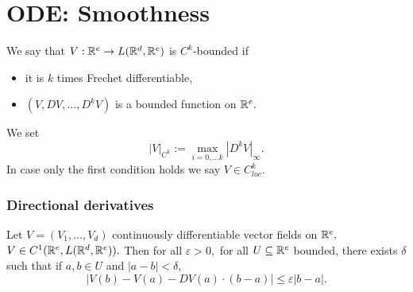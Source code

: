 \section{ODE: Smoothness}

\begin{definition}
    We say that $V: \mathbb{R}^e \rightarrow L(\mathbb{R}^d, \mathbb{R}^e)$ is $C^k$-bounded if
    \begin{itemize}
        \item it is $k$ times Frechet differentiable,
        \item $(V, DV, \ldots, D^k V)$ is a bounded function on $\mathbb{R}^e.$
    \end{itemize}
    We set
    \begin{equation}
        |V|_{C^k} := \max_{i=0, \ldots k} |D^k V|_\infty.
    \end{equation}
    In case only the first condition holds we say $V \in C^k_{loc}.$
\end{definition}

\subsubsection{Directional derivatives}

\begin{lemma}
    Let $V = (V_1, \ldots, V_d)$ continuously differentiable vector fields on $\mathbb{R}^e,$ $V \in C^1(\mathbb{R}^e, L(\mathbb{R}^d,\mathbb{R}^e)).$
    Then for all $\varepsilon > 0,$ for all $U \subseteq \mathbb{R}^e$ bounded, there exists $\delta$ such that if $a,b \in U$ and $|a-b|<\delta$, 
    \begin{equation}
        |V(b) - V(a) - DV(a) \cdot (b - a)| \leq \varepsilon |b - a|. 
    \end{equation}
\end{lemma}

